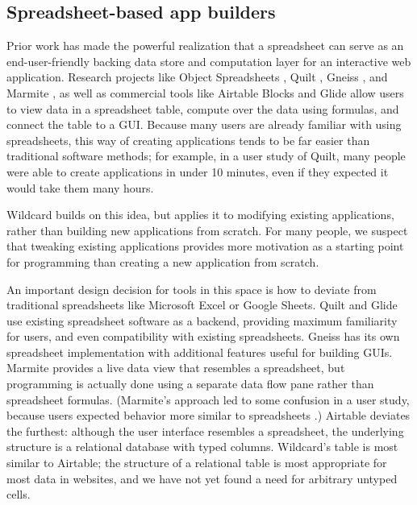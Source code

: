 \documentclass[english,submission]{programming}
\begin{document}
\hypertarget{spreadsheet-based-app-builders}{%
\subsection{Spreadsheet-based app
builders}\label{spreadsheet-based-app-builders}}

Prior work has made the powerful realization that a spreadsheet can
serve as an end-user-friendly backing data store and computation layer
for an interactive web application. Research projects like Object
Spreadsheets \autocite{mccutchen2016}, Quilt \autocite{benson2014},
Gneiss \autocite{chang2014}, and Marmite \autocite{wong2007}, as well as
commercial tools like Airtable Blocks \autocite{zotero-79} and Glide
\autocite{zotero-81} allow users to view data in a spreadsheet table,
compute over the data using formulas, and connect the table to a GUI.
Because many users are already familiar with using spreadsheets, this
way of creating applications tends to be far easier than traditional
software methods; for example, in a user study of Quilt, many people
were able to create applications in under 10 minutes, even if they
expected it would take them many hours.

Wildcard builds on this idea, but applies it to modifying existing
applications, rather than building new applications from scratch. For
many people, we suspect that tweaking existing applications provides
more motivation as a starting point for programming than creating a new
application from scratch.

An important design decision for tools in this space is how to deviate
from traditional spreadsheets like Microsoft Excel or Google Sheets.
Quilt and Glide use existing spreadsheet software as a backend,
providing maximum familiarity for users, and even compatibility with
existing spreadsheets. Gneiss has its own spreadsheet implementation
with additional features useful for building GUIs. Marmite provides a
live data view that resembles a spreadsheet, but programming is actually
done using a separate data flow pane rather than spreadsheet formulas.
(Marmite's approach led to some confusion in a user study, because users
expected behavior more similar to spreadsheets \autocite{wong2007}.)
Airtable deviates the furthest: although the user interface resembles a
spreadsheet, the underlying structure is a relational database with
typed columns. Wildcard's table is most similar to Airtable; the
structure of a relational table is most appropriate for most data in
websites, and we have not yet found a need for arbitrary untyped cells.
\end{document}
